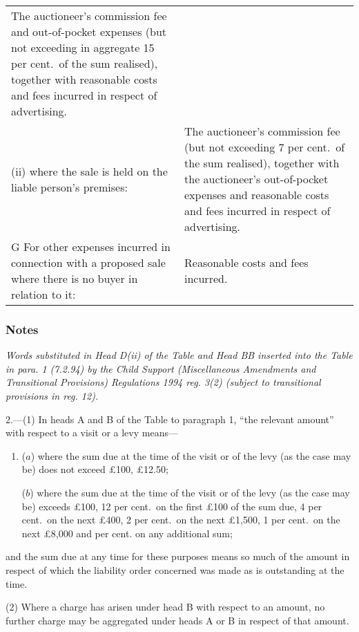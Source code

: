 \documentclass[a4paper]{article}
\newcommand\amendment[1]{\subsubsection*{Notes}{\itshape\frenchspacing\footnotesize #1 \par}}
\begin{document}
\begin{longtable}{p{135.43257pt}p{185.55615pt}}
The auctioneer’s commission fee and out-of-pocket expenses (but not exceeding in aggregate 15 per cent.\ of the sum realised), together with reasonable costs and fees incurred in respect of advertising.\\
\hspace{12pt}(ii) where the sale is held on the liable person’s premises:&
The auctioneer’s commission fee (but not exceeding 7\textonehalf{} per cent.\ of the sum realised), together with the auctioneer’s out-of-pocket expenses and reasonable costs and fees incurred in respect of advertising.\\
G {} For other expenses incurred in connection with a proposed sale where there is no buyer in relation to it:&
Reasonable costs and fees incurred.\\
\end{longtable}

\amendment{
Words substituted in Head D(ii) of the Table and Head BB inserted into the Table in para. 1 (7.2.94) by the Child Support (Miscellaneous Amendments and Transitional Provisions) Regulations 1994 reg. 3(2) (subject to transitional provisions in reg. 12).
}

\medskip

2.—(1) In heads A and B of the Table to paragraph 1, “the relevant amount” with respect to a visit or a levy means—
\begin{enumerate}\item[]
($a$) where the sum due at the time of the visit or of the levy (as the case may be) does not exceed £100, £12.50;

($b$) where the sum due at the time of the visit or of the levy (as the case may be) exceeds £100, 12\textonehalf{} per cent.\ on the first £100 of the sum due, 4 per cent.\ on the next £400, 2\textonehalf{} per cent.\ on the next £1,500, 1 per cent.\ on the next £8,000 and \textonequarter{} per cent. on any additional sum;
\end{enumerate}
and the sum due at any time for these purposes means so much of the amount in respect of which the liability order concerned was made as is outstanding at the time.

(2) Where a charge has arisen under head B with respect to an amount, no further charge may be aggregated under heads A or B in respect of that amount.
\end{document}
